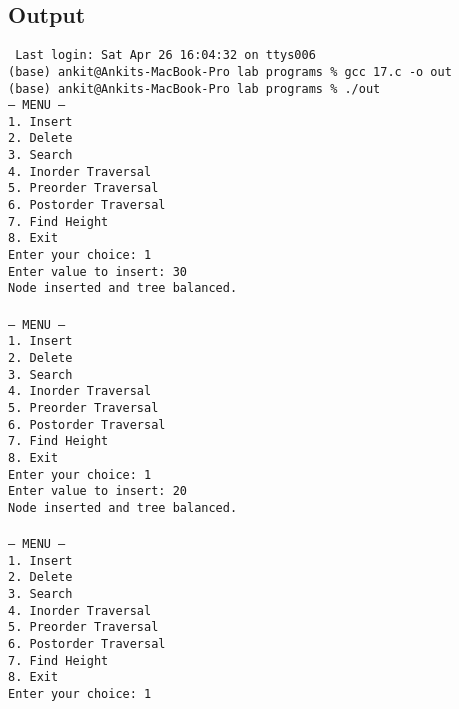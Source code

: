 \documentclass[12pt,a4paper]{article}
\begin{document}
\subsection*{Output}
\begin{tcolorbox}[terminalstyle, title=Sample Output]
\texttt{
Last login: Sat Apr 26 16:04:32 on ttys006\\
(base) ankit@Ankits-MacBook-Pro lab programs \% gcc 17.c -o out\\
(base) ankit@Ankits-MacBook-Pro lab programs \% ./out\\
--- MENU ---\\
1. Insert\\
2. Delete\\
3. Search\\
4. Inorder Traversal\\
5. Preorder Traversal\\
6. Postorder Traversal\\
7. Find Height\\
8. Exit\\
Enter your choice: 1\\
Enter value to insert: 30\\
Node inserted and tree balanced.\\
\\
--- MENU ---\\
1. Insert\\
2. Delete\\
3. Search\\
4. Inorder Traversal\\
5. Preorder Traversal\\
6. Postorder Traversal\\
7. Find Height\\
8. Exit\\
Enter your choice: 1\\
Enter value to insert: 20\\
Node inserted and tree balanced.\\
\\
--- MENU ---\\
1. Insert\\
2. Delete\\
3. Search\\
4. Inorder Traversal\\
5. Preorder Traversal\\
6. Postorder Traversal\\
7. Find Height\\
8. Exit\\
Enter your choice: 1\\
}
\end{tcolorbox}
\end{document}

